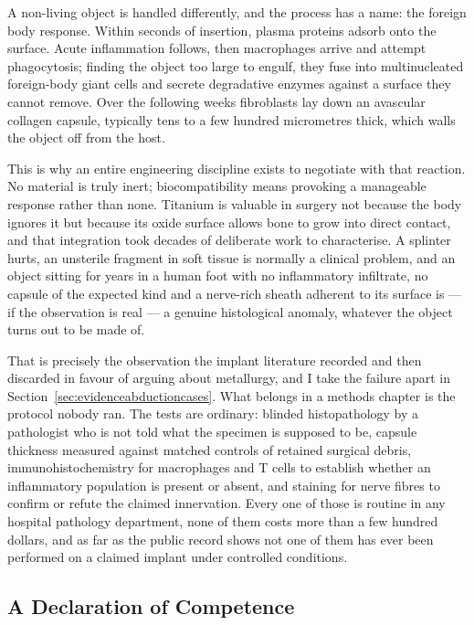 A non-living object is handled differently, and the process has a name: the foreign body response.
Within seconds of insertion, plasma proteins adsorb onto the surface. Acute inflammation follows,
then macrophages arrive and attempt phagocytosis; finding the object too large to engulf, they fuse
into multinucleated foreign-body giant cells and secrete degradative enzymes against a surface they
cannot remove. Over the following weeks fibroblasts lay down an avascular collagen capsule,
typically tens to a few hundred micrometres thick, which walls the object off from the host.

This is why an entire engineering discipline exists to negotiate with that reaction. No material is
truly inert; biocompatibility means provoking a manageable response rather than none. Titanium is
valuable in surgery not because the body ignores it but because its oxide surface allows bone to
grow into direct contact, and that integration took decades of deliberate work to characterise. A
splinter hurts, an unsterile fragment in soft tissue is normally a clinical problem, and an object
sitting for years in a human foot with no inflammatory infiltrate, no capsule of the expected kind
and a nerve-rich sheath adherent to its surface is --- if the observation is real --- a genuine
histological anomaly, whatever the object turns out to be made of.

That is precisely the observation the implant literature recorded and then discarded in favour of
arguing about metallurgy, and I take the failure apart in Section~\ref{sec:evidenceabductioncases}.
What belongs in a methods chapter is the protocol nobody ran. The tests are ordinary: blinded
histopathology by a pathologist who is not told what the specimen is supposed to be, capsule
thickness measured against matched controls of retained surgical debris, immunohistochemistry for
macrophages and T cells to establish whether an inflammatory population is present or absent, and
staining for nerve fibres to confirm or refute the claimed innervation. Every one of those is
routine in any hospital pathology department, none of them costs more than a few hundred dollars,
and as far as the public record shows not one of them has ever been performed on a claimed implant
under controlled conditions. 

\subsection{A Declaration of Competence}

